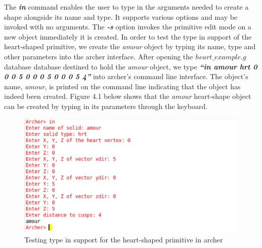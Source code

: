 The   \textit{\textbf{in}}   command   enables   the   user   to   type   in   the   arguments   needed   to   create   a  shape   alongside   its   name   and   type.   It   supports   various   options   and   may   be  
invoked   with   no   arguments.   The   \textit{\textbf{-­s}}   option   invokes   the   primitive   edit   mode   on   a  
new   object   immediately   it   is   created.   In   order   to   test   the   type   in   support   of   the  
heart­-shaped   primitive,   we   create   the   \textit{amour}   object   by   typing   its   name,   type   and  
other   parameters   into   the   archer   interface.   After   opening   the   $heart\_example.g$  
database   database   destined   to   hold   the   \textit{amour}   object,   we   type   \textit{\textbf{“in   amour   hrt   0  
0   0   5   0   0   0   5   0   0   0   5   4”}}   into   archer's   command   line   interface.   The   object's  
name,   \textit{amour},   is   printed   on   the   command ­line   indicating   that   the   object   has  
indeed   been   created. Figure   4.1 below   shows   that   the   \textit{amour}  
heart-­shape object can be created by typing in its parameters through the keyboard.

\begin{figure}[htbp]
\centering
\includegraphics[trim=0.0cm 0.5cm 0.1cm 0.1cm, clip=true, totalheight=0.4\textheight]{Pictures/Typein.png}
\caption[Testing type in support for the heart-­shaped primitive in archer]{Testing type in support for the heart­-shaped primitive in archer}
\label{Typein}
\end{figure}

\clearpage


